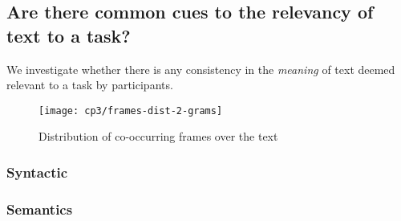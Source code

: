 

\subsection{Are there common cues to the relevancy of text to a task?}
\label{cp3:text-analysis}

We investigate
whether there is any consistency in the \textit{meaning} of
text deemed relevant to a task by participants.











% 


\begin{figure}
\centering
\texttt{[image: cp3/frames-dist-2-grams]}
\caption{Distribution of co-occurring frames over the text}
\label{fig:frame-co-ocurrance}
\end{figure}





\subsubsection{Syntactic}


\subsubsection{Semantics}


